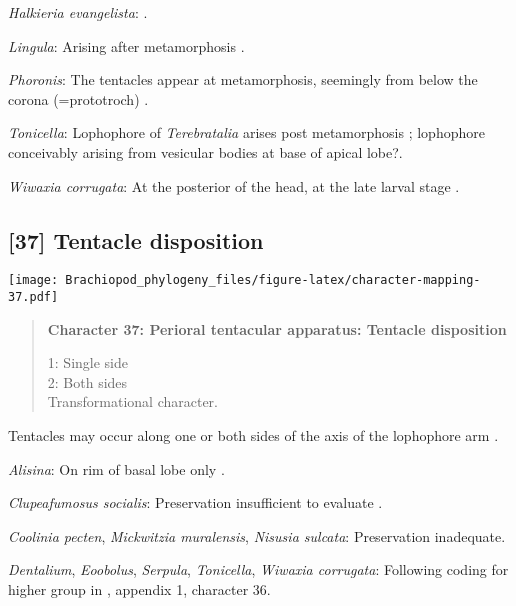 \documentclass[openany]{book}
\theoremstyle{definition}
\theoremstyle{definition}
\theoremstyle{definition}
\theoremstyle{remark}
\begin{document}
\hypertarget{Halkieria_evangelista-coding-36}{}
\emph{Halkieria evangelista}: \citep{Adrianov2006}.

\hypertarget{Lingula-coding-36}{}
\emph{Lingula}: Arising after metamorphosis \citep{Nielsen1971}.

\hypertarget{Phoronis-coding-36}{}
\emph{Phoronis}: The tentacles appear at metamorphosis, seemingly from
below the corona (=prototroch) \citep{Young2002}.

\hypertarget{Tonicella-coding-36}{}
\emph{Tonicella}: Lophophore of \emph{Terebratalia} arises post
metamorphosis \citep{Young2002}; lophophore conceivably arising from
vesicular bodies at base of apical lobe?.

\hypertarget{Wiwaxia_corrugata-coding-36}{}
\emph{Wiwaxia corrugata}: At the posterior of the head, at the late
larval stage \citep{Santagata2004}.

\subsection*{{[}37{]} Tentacle disposition}\label{tentacle-disposition}

\texttt{[image: Brachiopod\_phylogeny\_files/figure-latex/character-mapping-37.pdf]}

\begin{quote}
\textbf{Character 37: Perioral tentacular apparatus: Tentacle
disposition}

1: Single side\\
2: Both sides\\
Transformational character.
\end{quote}

Tentacles may occur along one or both sides of the axis of the
lophophore arm \citep{Carlson1995Phylogeneticrelationships}.

\hypertarget{Alisina-coding-37}{}
\emph{Alisina}: On rim of basal lobe only \citep{Morton1959}.

\hypertarget{Clupeafumosus_socialis-coding-37}{}
\emph{Clupeafumosus socialis}: Preservation insufficient to evaluate
\citep{Holmer2006Aspinose}.

\hypertarget{Coolinia_pecten-coding-37}{}
\emph{Coolinia pecten}, \emph{Mickwitzia muralensis}, \emph{Nisusia
sulcata}: Preservation inadequate.

\hypertarget{Dentalium-coding-37}{}
\emph{Dentalium}, \emph{Eoobolus}, \emph{Serpula}, \emph{Tonicella},
\emph{Wiwaxia corrugata}: Following coding for higher group in
\citet{Carlson1995Phylogeneticrelationships}, appendix 1, character 36.
\end{document}
